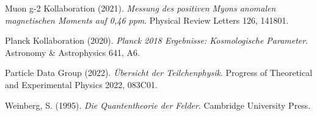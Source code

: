 \documentclass[12pt,a4paper]{report}
\begin{document}
\begin{thebibliography}{99}
		Muon g-2 Kollaboration (2021). \textit{Messung des positiven Myons anomalen magnetischen Moments auf 0,46 ppm}. Physical Review Letters 126, 141801.
		
		Planck Kollaboration (2020). \textit{Planck 2018 Ergebnisse: Kosmologische Parameter}. Astronomy \& Astrophysics 641, A6.
		
		Particle Data Group (2022). \textit{Übersicht der Teilchenphysik}. Progress of Theoretical and Experimental Physics 2022, 083C01.
		
		Weinberg, S. (1995). \textit{Die Quantentheorie der Felder}. Cambridge University Press.
	\end{thebibliography}
	
\end{document}
